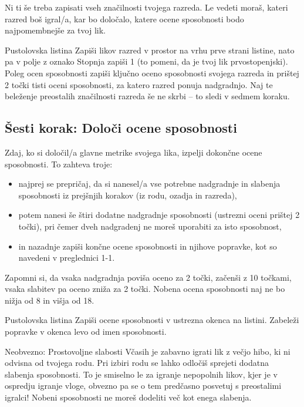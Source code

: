 Ni ti še treba zapisati vseh značilnosti tvojega razreda. Le vedeti moraš, kateri razred boš igral/a, kar bo določalo, katere ocene sposobnosti bodo najpomembnejše za tvoj lik.

\begin{rpg-titlebox}{Pustolovska listina}
    Zapiši likov razred v prostor na vrhu prve strani listine, nato pa v polje z oznako Stopnja zapiši 1 (to pomeni, da je tvoj lik prvostopenjski). Poleg ocen sposobnosti zapiši ključno oceno sposobnosti svojega razreda in prištej 2 točki tisti oceni sposobnosti, za katero razred ponuja nadgradnjo. Naj te beleženje preostalih značilnosti razreda še ne skrbi -- to sledi v sedmem koraku.
\end{rpg-titlebox}

\subsection{Šesti korak: Določi ocene sposobnosti}
Zdaj, ko si določil/a glavne metrike svojega lika, izpelji dokončne ocene sposobnosti. To zahteva troje:

\begin{itemize}
    \item najprej se prepričaj, da si nanesel/a vse potrebne nadgradnje in slabenja sposobnosti iz prejšnjih korakov (iz rodu, ozadja in razreda),
    \item potem nanesi še štiri dodatne nadgradnje sposobnosti (ustrezni oceni prištej 2 točki), pri čemer dveh nadgradenj ne moreš uporabiti za isto sposobnost,
    \item in nazadnje zapiši končne ocene sposobnosti in njihove popravke, kot so navedeni v preglednici 1-1.
\end{itemize}

Zapomni si, da vsaka nadgradnja poviša oceno za 2 točki, začenši z 10 točkami, vsaka slabitev pa oceno zniža za 2 točki. Nobena ocena sposobnosti naj ne bo nižja od 8 in višja od 18.

\begin{rpg-titlebox}{Pustolovska listina}
    Zapiši ocene sposobnosti v ustrezna okenca na listini. Zabeleži popravke v okenca levo od imen sposobnosti.
\end{rpg-titlebox}

\begin{rpg-titlebox}{Neobvezno: Prostovoljne slabosti}
    Včasih je zabavno igrati lik z večjo hibo, ki ni odvisna od tvojega rodu. Pri izbiri rodu se lahko odločiš sprejeti dodatna slabenja sposobnosti. To je smiselno le za igranje nepopolnih likov, kjer je v ospredju igranje vloge, obvezno pa se o tem predčasno posvetuj s preostalimi igralci! Nobeni sposobnosti ne moreš dodeliti več kot enega slabenja.
\end{rpg-titlebox}

